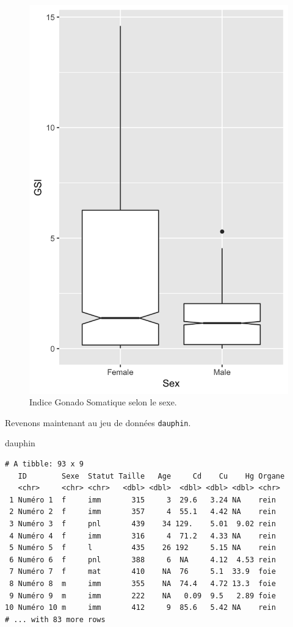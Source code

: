 \documentclass[a4paperpaper,]{article}
\newenvironment{Shaded}{\begin{snugshade}}{\end{snugshade}}
\newcommand{\NormalTok}[1]{#1}
\theoremstyle{definition}
\theoremstyle{definition}
\theoremstyle{definition}
\theoremstyle{remark}
\begin{document}
\begin{figure}[htpb]

{\centering \includegraphics[width=0.5\linewidth]{figure/unnamed-chunk-140-1} 

}

\caption{Indice Gonado Somatique  selon le sexe.}\label{fig:unnamed-chunk-140}
\end{figure}

Revenons maintenant au jeu de données \texttt{dauphin}.

\begin{Shaded}
\begin{Highlighting}[]
\NormalTok{dauphin}
\end{Highlighting}
\end{Shaded}

\begin{verbatim}
# A tibble: 93 x 9
   ID        Sexe  Statut Taille   Age     Cd    Cu    Hg Organe
   <chr>     <chr> <chr>   <dbl> <dbl>  <dbl> <dbl> <dbl> <chr> 
 1 Numéro 1  f     imm       315     3  29.6   3.24 NA    rein  
 2 Numéro 2  f     imm       357     4  55.1   4.42 NA    rein  
 3 Numéro 3  f     pnl       439    34 129.    5.01  9.02 rein  
 4 Numéro 4  f     imm       316     4  71.2   4.33 NA    rein  
 5 Numéro 5  f     l         435    26 192     5.15 NA    rein  
 6 Numéro 6  f     pnl       388     6  NA     4.12  4.53 rein  
 7 Numéro 7  f     mat       410    NA  76     5.1  33.9  foie  
 8 Numéro 8  m     imm       355    NA  74.4   4.72 13.3  foie  
 9 Numéro 9  m     imm       222    NA   0.09  9.5   2.89 foie  
10 Numéro 10 m     imm       412     9  85.6   5.42 NA    rein  
# ... with 83 more rows
\end{verbatim}
\end{document}
